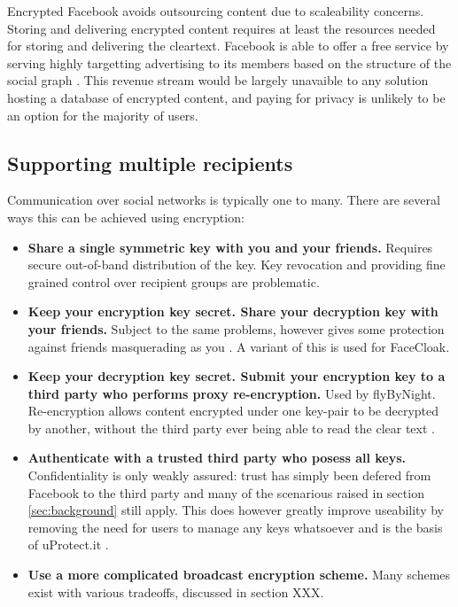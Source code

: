 Encrypted Facebook avoids outsourcing content due to scaleability concerns. Storing and delivering encrypted content requires at least the resources needed for storing and delivering the cleartext. Facebook is able to offer a free service by serving highly targetting advertising to its members based on the structure of the social graph \cite{fb-ads}. This revenue stream would be largely unavaible to any solution hosting a database of encrypted content, and paying for privacy is unlikely to be an option for the majority of users.


\subsection{Supporting multiple recipients}

Communication over social networks is typically one to many. There are several ways this can be achieved using encryption:

\begin {itemize}

    \item \textbf{Share a single symmetric key with you and your friends.} Requires secure out-of-band distribution of the key. Key revocation and providing fine grained control over recipient groups are problematic.
    
    \item \textbf{Keep your encryption key secret. Share your decryption key with your friends.} Subject to the same problems, however gives some protection against friends masquerading as you \cite{facecloak}. A variant of this is used for FaceCloak.
    
    \item \textbf{Keep your decryption key secret. Submit your encryption key to a third party who performs proxy re-encryption.} Used by flyByNight. Re-encryption allows content encrypted under one key-pair to be decrypted by another, without the third party ever being able to read the clear text \cite{flybynight}.
    
    \item \textbf{Authenticate with a trusted third party who posess all keys.} Confidentiality is only weakly assured: trust has simply been defered from Facebook to the third party and many of the scenarious raised in section \ref{sec:background} still apply. This does however greatly improve useability by removing the need for users to manage any keys whatsoever and is the basis of uProtect.it \cite{uprotect}.
    
    \item \textbf{Use a more complicated broadcast encryption scheme.} Many schemes exist with various tradeoffs, discussed in section XXX.
    
\end{itemize}

